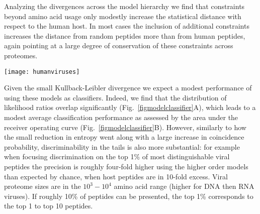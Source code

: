 \documentclass[superscriptaddress,twocolumn,pre]{revtex4}
\newcommand{\<}{\langle}
\renewcommand{\>}{\rangle}
\begin{document}
Analyzing the divergences across the model hierarchy we find that constraints beyond amino acid usage only modestly increase the statistical distance with respect to the human host. In most cases the inclusion of additional constraints increases the distance from random peptides more than from human peptides, again pointing at a large degree of conservation of these constraints across proteomes.

\begin{figure*}
    \begin{center}
    \texttt{[image: humanviruses]}
    \end{center}
    \caption{Performance of the models as classifiers. (A) Distributions of likelihood ratios for peptides from host and virus proteins. (B) Sensitivity-specificity tradeoff curve for various models. (C) Precision-recall characteristics at a 10-fold excess of self-peptides.
    \label{figmodelclassifier}
    }
\end{figure*}

Given the small Kullback-Leibler divergence we expect a modest performance of using these models as classifiers. Indeed, we find that the distribution of likelihood ratios overlap significantly (Fig.~\ref{figmodelclassifier}A), which leads to a modest average classification performance as assessed by the area under the receiver operating curve (Fig.~\ref{figmodelclassifier}B). However, similarly to how the small reduction in entropy went along with a large increase in coincidence probability, discriminability in the tails is also more substantial: for example when focusing discrimination on the top 1\% of most distinguishable viral peptides the precision is roughly four-fold higher using the higher order models than expected by chance, when host peptides are in 10-fold excess. Viral proteome sizes are in the $10^3-10^4$ amino acid range (higher for DNA then RNA viruses). If roughly 10\% of peptides can be presented, the top 1\% corresponds to the top 1 to top 10 peptides.





\end{document}
